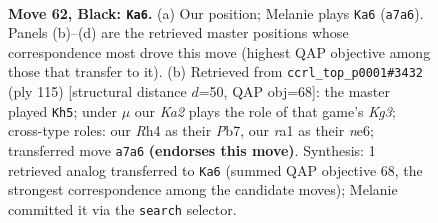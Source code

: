 \documentclass[11pt]{article}
\begin{document}
\clearpage

\begin{figure}[p]\centering
\begin{subfigure}{0.46\textwidth}\centering
\resizebox{\linewidth}{!}{%
\newchessgame
\chessboard[
  setfen={1Q6/k7/8/p2pBp2/P6r/8/8/RN4K1 b - - 5 62},
  showmover=false,
  pgfstyle=straightmove, color=movearrow, markmove={a7-a6}
]}
\caption{}
\end{subfigure}\hfill
\begin{subfigure}{0.46\textwidth}\centering
\resizebox{\linewidth}{!}{%
\newchessgame
\chessboard[
  setfen={8/pp6/4NRk1/3bB1p1/8/P6r/1P1K4/8 b - - 9 58},
  showmover=false,
  pgfstyle=straightmove, color=movearrow, markmove={g6-h5}
]}
\caption{}
\end{subfigure}
\\[4pt]

\caption{\textbf{Move 62, Black: \texttt{Ka6}.} (a) Our position; Melanie plays \texttt{Ka6} (\texttt{a7a6}). Panels (b)--(d) are the retrieved master positions whose correspondence most drove this move (highest QAP objective among those that transfer to it). (b) Retrieved from \texttt{ccrl\_top\_p0001\#3432} (ply 115) [structural distance $d$=50, QAP obj=68]: the master played \texttt{Kh5}; under $\mu$ our \emph{Ka2} plays the role of that game's \emph{Kg3}; cross-type roles: our \emph{R}h4 as their \emph{P}b7, our \emph{r}a1 as their \emph{n}e6; transferred move \texttt{a7a6} \textbf{(endorses this move)}. Synthesis: 1 retrieved analog transferred to \texttt{Ka6} (summed QAP objective 68, the strongest correspondence among the candidate moves); Melanie committed it via the \texttt{search} selector.}
\label{fig:thought-m123}
\end{figure}

\clearpage
\end{document}
